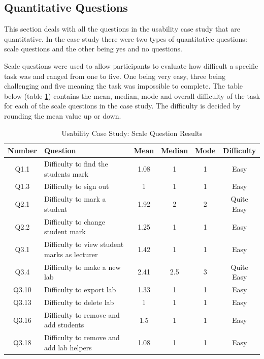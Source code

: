 \documentclass[11pt]{report}
\begin{document}
\subsection{Quantitative Questions}

This section deals with all the questions in the usability case study that are quantitative. In the case study there were two types of quantitative questions: scale questions and the other being  yes and no questions.

Scale questions were used to allow participants to evaluate how difficult a specific task was and ranged from one to five. One being very easy, three being challenging and five meaning the task was impossible to complete. 
The table below (table \ref{table:usability}) contains the mean, median, mode and overall difficulty of the task for each of the scale questions in the case study. The difficulty is decided by rounding the mean value up or down.

\setlength\LTleft{0pt}
\setlength\LTright{0pt}


\begin{spacing}{1.2}
\begin{longtable}{@{\extracolsep{\fill}}|c|l|c|c|c|c|}
\caption{Usability Case Study: Scale Question Results} \label{table:usability} \\ \hline

\textbf{Number} & \textbf{Question} & \textbf{Mean} & \textbf{Median} & \textbf{Mode} & \textbf{Difficulty}\\ \hline

Q1.1 & Difficulty to find the students mark & 1.08 & 1 & 1 & Easy\\ \hline
Q1.3 & Difficulty to sign out & 1 & 1 & 1 & Easy \\ \hline

Q2.1 & Difficulty to mark a student & 1.92 & 2 & 2 & Quite Easy \\ \hline
Q2.2 & Difficulty to change student mark & 1.25 & 1 & 1 &  Easy \\ \hline

Q3.1 & Difficulty to view student marks as lecturer & 1.42 & 1 & 1 &  Easy \\ \hline
Q3.4 & Difficulty to make a new lab & 2.41 & 2.5 & 3 & Quite Easy \\ \hline
Q3.10 & Difficulty to export lab & 1.33 & 1 & 1 &  Easy \\ \hline
Q3.13 & Difficulty to delete lab & 1 & 1 & 1 &  Easy \\ \hline
Q3.16 & Difficulty to remove and add students & 1.5 & 1 & 1 &  Easy \\ \hline
Q3.18 & Difficulty to remove and add lab helpers & 1.08 & 1 & 1 & Easy \\ \hline

\end{longtable}
\end{spacing}
\end{document}
